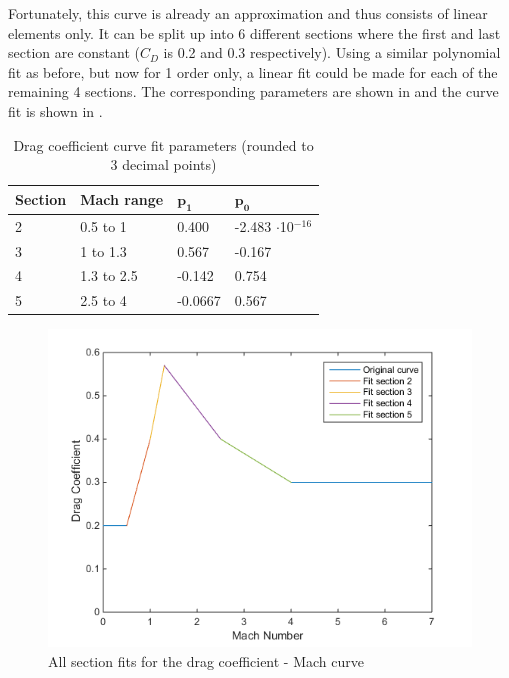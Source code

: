 Fortunately, this curve is already an approximation and thus consists of linear elements only. It can be split up into 6 different sections where the first and last section are constant ($C_{D}$ is 0.2 and 0.3 respectively). Using a similar polynomial fit as before, but now for 1 order only, a linear fit could be made for each of the remaining 4 sections. The corresponding parameters are shown in  and the curve fit is shown in .


\begin{table}[!ht]
\begin{center}
\caption{Drag coefficient curve fit parameters (rounded to 3 decimal points)}
\label{tab:dragCoeffPara}
\begin{tabular}{|l|l||l|l|}
\hline 
\textbf{Section}  & \textbf{Mach range}& $\mathbf{p_{1}}$ & $\mathbf{p_{0}}$ \\ \hline 
2  & 0.5 to 1  & 0.400 & -2.483 $\cdot$10$^{-16}$  \\ \hline
3  & 1 to 1.3  & 0.567 & -0.167  \\ \hline
4  &  1.3 to 2.5 & -0.142 & 0.754 \\ \hline
5  &  2.5 to 4 & -0.0667 & 0.567 \\ \hline
\end{tabular}
\end{center}
\end{table}



\begin{figure}[!ht]
\centering
\includegraphics[width=1.0\textwidth]{figures/software/dragCoeffFit.png}
\caption{All section fits for the drag coefficient - Mach curve}
\label{fig:dragCoeffFit}
\end{figure}




